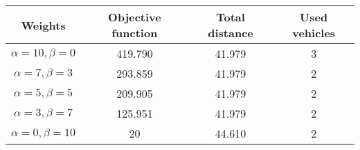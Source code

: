 {
\renewcommand{\arraystretch}{2}
\begin{longtable}[h]{| c | c | c | c |}
    \hline
    \textbf{Weights} & \textbf{Objective function} & \textbf{Total distance} & \textbf{Used vehicles} \\
    \hline
    \endhead
    $\alpha = 10, \beta = 0$ & 419.790 & 41.979 & 3 \\
    \hline
    $\alpha = 7, \beta = 3$  & 293.859 & 41.979 & 2 \\
    \hline
    $\alpha = 5, \beta = 5$  & 209.905 & 41.979 & 2 \\
    \hline
    $\alpha = 3, \beta = 7$  & 125.951 & 41.979 & 2 \\
    \hline
    $\alpha = 0, \beta = 10$ &      20 & 44.610 & 2 \\
    \hline
\end{longtable}
}
